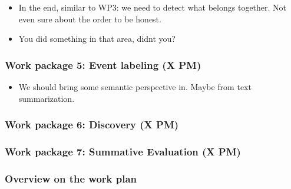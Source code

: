 \begin{itemize}
\item In the end, similar to WP3: we need to detect what belongs together. Not even sure about the order to be honest. 
\item You did something in that area, didnt you?
\end{itemize}

\subsubsection{Work package 5: Event labeling (X PM)}
\label{sec:wp5}

\begin{itemize}
\item We should bring some semantic perspective in. Maybe from text summarization. 
\end{itemize}

\subsubsection{Work package 6: Discovery (X PM)}
\label{sec:wp6}

\subsubsection{Work package 7: Summative Evaluation (X PM)}
\label{sec:wp7}


\subsubsection{Overview on the work plan}

